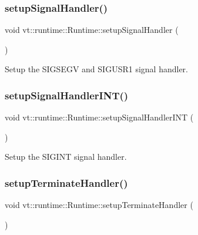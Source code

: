 \subsubsection{\texorpdfstring{setup\+Signal\+Handler()}{setupSignalHandler()}}
{\footnotesize\ttfamily void vt\+::runtime\+::\+Runtime\+::setup\+Signal\+Handler (\begin{DoxyParamCaption}{ }\end{DoxyParamCaption})\hspace{0.3cm}{\ttfamily [protected]}}



Setup the S\+I\+G\+S\+E\+GV and S\+I\+G\+U\+S\+R1 signal handler. 

\mbox{\label{structvt_1_1runtime_1_1_runtime_a382e68597ae7acb16bdb9f1c3ab4f010}} 
\subsubsection{\texorpdfstring{setup\+Signal\+Handler\+I\+N\+T()}{setupSignalHandlerINT()}}
{\footnotesize\ttfamily void vt\+::runtime\+::\+Runtime\+::setup\+Signal\+Handler\+I\+NT (\begin{DoxyParamCaption}{ }\end{DoxyParamCaption})\hspace{0.3cm}{\ttfamily [protected]}}



Setup the S\+I\+G\+I\+NT signal handler. 

\mbox{\label{structvt_1_1runtime_1_1_runtime_ad66c903b37209c7499ebdf53efb5f9b3}} 
\subsubsection{\texorpdfstring{setup\+Terminate\+Handler()}{setupTerminateHandler()}}
{\footnotesize\ttfamily void vt\+::runtime\+::\+Runtime\+::setup\+Terminate\+Handler (\begin{DoxyParamCaption}{ }\end{DoxyParamCaption})\hspace{0.3cm}{\ttfamily [protected]}}




